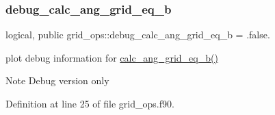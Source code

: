 \subsubsection{\texorpdfstring{debug\+\_\+calc\+\_\+ang\+\_\+grid\+\_\+eq\+\_\+b}{debug\_calc\_ang\_grid\_eq\_b}}
{\footnotesize\ttfamily logical, public grid\+\_\+ops\+::debug\+\_\+calc\+\_\+ang\+\_\+grid\+\_\+eq\+\_\+b = .false.}



plot debug information for \hyperlink{namespacegrid__ops_a06107dbdfd1dd62e372cc29ab0255bad}{calc\+\_\+ang\+\_\+grid\+\_\+eq\+\_\+b()} 

\begin{DoxyNote}{Note}
Debug version only 
\end{DoxyNote}


Definition at line 25 of file grid\+\_\+ops.\+f90.

